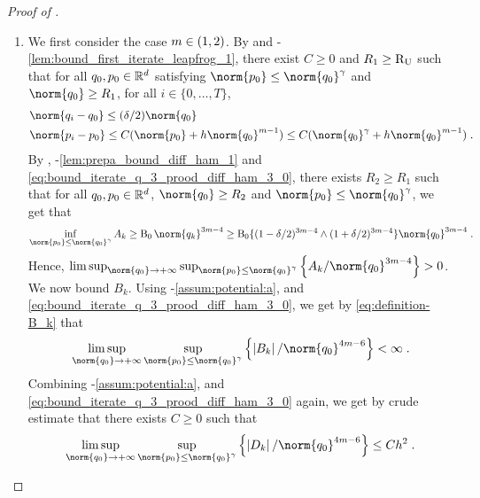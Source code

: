 \begin{proof}[Proof of ]
\begin{enumerate}[label=(\alph*),leftmargin=0cm,itemindent=0.5cm,labelwidth=1.2\itemindent,labelsep=0cm,align=left]
\item
We first consider the case $m\in \left(1,2\right)$.
  By  and -\ref{lem:bound_first_iterate_leapfrog_1}, there exist $C \geq 0$ and  $R_1 \geq \operatorname{R_U}$ such that for all $q_0,p_0 \in \mathbb{R}^d$ satisfying $ \norm{p_0} \leq
\norm{\q_0}^{\gamma}$ and $\norm{\q_0} \geq R_1$, for all $i \in
\{0,\ldots,T\}$,
\begin{equation}
\label{eq:bound_iterate_q_3_prood_diff_ham_3_0}
\begin{aligned}
&\norm{\q_{i}-\q_{0}}\leq (\delta/2) \norm{\q_0} \\ 
&\norm{\p_i - \p_0} \leq C(\norm{\p_0} + h \norm{q_0}^{m-1}) \leq C(\norm{\q_0}^\gamma + h \norm{q_0}^{m-1}) \eqsp.
\end{aligned}
\end{equation}
By  , -\ref{lem:prepa_bound_diff_ham_1} and \eqref{eq:bound_iterate_q_3_prood_diff_ham_3_0}, there exists $R_2 \geq R_1$ such that for all $q_0,p_0 \in \mathbb{R}^d$, $\norm{\q_0} \geq R_2$ and $\norm{\p_0} \leq \norm{\q_0}^{\gamma}$,
we get that
\begin{equation}
\label{eq:bound_A_k}
  \inf_{\norm{p_0} \leq \norm{q_0}^{\gamma}} A_k \geq \BB_0 \norm{q_k}^{3\m-4} \geq
  \BB_0 \{ (1-\delta/2)^{3m-4} \wedge (1+\delta/2)^{3m-4} \} \norm{q_0}^{3\m-4} \eqsp.
\end{equation}
Hence, $\limsup_{\norm{q_0} \to \plusinfty} \sup_{\norm{p_0} \leq \norm{q_0}^{\gamma}}\defEns{A_k/\norm{q_0}^{3\m-4}} > 0$.
We now bound $B_k$. Using -\ref{assum:potential:a},  and \eqref{eq:bound_iterate_q_3_prood_diff_ham_3_0}, we get by \eqref{eq:definition-B_k} that
\begin{equation}
\label{eq:bound_B_k}
\limsup_{\norm{q_0} \to \plusinfty} \sup_{\norm{p_0} \leq \norm{q_0}^{\gamma}}\defEns{\abs{B_k}/\norm{q_0}^{4\m-6}} < \infty \eqsp.
\end{equation}
Combining -\ref{assum:potential:a},  and \eqref{eq:bound_iterate_q_3_prood_diff_ham_3_0} again, we get by crude estimate that there exists $C \geq 0$ such that
\begin{equation}
  \label{eq:bound_D_k}
  \limsup_{\norm{q_0} \to \plusinfty} \sup_{\norm{p_0} \leq \norm{q_0}^{\gamma}} \defEns{\abs{D_k}/\norm{q_0}^{4\m-6}} \leq C h^2 \eqsp.

\end{equation}
\end{enumerate}
\end{proof}
